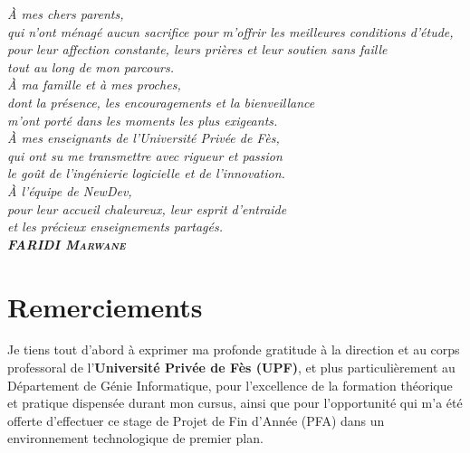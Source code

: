 \documentclass[12pt,a4paper,oneside]{report}
\begin{document}
\vspace*{1.8cm}

\begin{center}
\begin{minipage}{0.85\textwidth}
\centering\large\itshape
\`A mes chers parents,\\
qui n'ont m\'enag\'e aucun sacrifice pour m'offrir les meilleures conditions d'\'etude,\\
pour leur affection constante, leurs pri\`eres et leur soutien sans faille\\
tout au long de mon parcours.\\[0.9cm]

\`A ma famille et \`a mes proches,\\
dont la pr\'esence, les encouragements et la bienveillance\\
m'ont port\'e dans les moments les plus exigeants.\\[0.9cm]

\`A mes enseignants de l'Universit\'e Priv\'ee de F\`es,\\
qui ont su me transmettre avec rigueur et passion\\
le go\^ut de l'ing\'enierie logicielle et de l'innovation.\\[0.9cm]

\`A l'\'equipe de NewDev,\\
pour leur accueil chaleureux, leur esprit d'entraide\\
et les pr\'ecieux enseignements partag\'es.\\[1.4cm]

\hfill\textbf{\textsc{FARIDI Marwane}}
\end{minipage}
\end{center}

\clearpage

\chapter*{Remerciements}

Je tiens tout d'abord \`a exprimer ma profonde gratitude \`a la direction et au corps professoral de l'\textbf{Universit\'e Priv\'ee de F\`es (UPF)}, et plus particuli\`erement au D\'epartement de G\'enie Informatique, pour l'excellence de la formation th\'eorique et pratique dispens\'ee durant mon cursus, ainsi que pour l'opportunit\'e qui m'a \'et\'e offerte d'effectuer ce stage de Projet de Fin d'Ann\'ee (PFA) dans un environnement technologique de premier plan.
\end{document}
